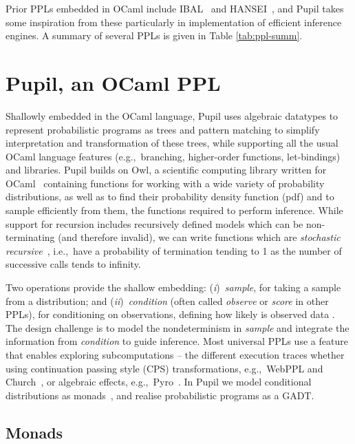 \documentclass[sigconf,timestamp]{acmart}
\newcommand{\one}{({\em i})\/}
\newcommand{\two}{({\em ii})\/}
\newcommand{\pupil}{Pupil\xspace}
\begin{document}
Prior PPLs embedded in OCaml include IBAL~\cite{ibal} and HANSEI~\cite{kiselyov2009embedded}, and \pupil takes some inspiration from these particularly in implementation of efficient inference engines. A summary of several PPLs is given in Table \ref{tab:ppl-summ}.

\section{\pupil, an OCaml PPL}
\label{s:pupil}

Shallowly embedded in the OCaml language, \pupil uses algebraic datatypes to represent probabilistic programs as trees and pattern matching to simplify interpretation and transformation of these trees, while supporting all the usual OCaml language features (e.g.,~branching, higher-order functions, let-bindings) and libraries. \pupil builds on Owl, a scientific computing library written for OCaml~\cite{owl} containing functions for working with a wide variety of probability distributions, as well as to find their probability density function (pdf) and to sample efficiently from them, the functions required to perform inference. While support for recursion includes  recursively defined models which can be non-terminating (and therefore invalid), we can write functions which are \textit{stochastic recursive}~\cite{siegmund}, i.e.,~have a probability of termination tending to 1 as the number of successive calls tends to infinity.

Two operations provide the shallow embedding: \one~\emph{sample}, for taking a sample from a distribution; and \two~\emph{condition} (often called \emph{observe} or \emph{score} in other PPLs), for conditioning on observations, defining how likely is observed data . The design challenge is to model the nondeterminism in \emph{sample} and integrate the information from \emph{condition} to guide inference. Most universal PPLs use a feature that enables exploring subcomputations -- the different execution traces whether using continuation passing style (CPS) transformations, e.g.,~WebPPL and Church~\cite{mobus2018structure,goodman2012church}, or algebraic effects, e.g.,~Pyro~\cite{bingham2019pyro}. In \pupil we model conditional distributions as monads~\cite{scibior2015practical}, and realise probabilistic programs as a GADT.

\subsection{Monads}
\end{document}
